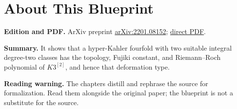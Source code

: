 

\chapter*{About This Blueprint}
\label{riemann-roch-polynomials-hyperkahler-fourfolds-about}


\textbf{Edition and PDF.} ArXiv preprint \href{https://arxiv.org/abs/2201.08152}{arXiv:2201.08152}; \href{https://arxiv.org/pdf/2201.08152}{direct PDF}.

\textbf{Summary.} It shows that a hyper-Kahler fourfold with two suitable integral degree-two classes has the topology, Fujiki constant, and Riemann--Roch polynomial of $K3^{[2]}$, and hence that deformation type.

\textbf{Reading warning.} The chapters distill and rephrase the source for formalization. Read them alongside the original paper; the blueprint is not a substitute for the source.













